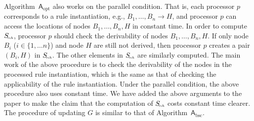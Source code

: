 \documentclass{article}
\begin{document}
Algorithm~$\mathsf{A}_{\text{opt}}$ also works on the parallel condition.
That is, each processor $p$ corresponds to a rule instantiation, e.g., $B_1,\ldots,B_n\rightarrow H$,
and processor $p$ can access the locations of nodes $B_1,\ldots,B_n, H$ in constant time.
In order to compute $S_{\!\textit{\tiny rch}}$, processor $p$ should check the derivability
of nodes $B_1,\ldots,B_n, H$. If only node $B_i$ ($i\in\{1,\ldots n\}$) and node $H$
are still not derived, then processor $p$ creates a pair $(B_i, H)$ in $S_{\!\textit{\tiny rch}}$.
The other elements in $S_{\!\textit{\tiny rch}}$ are similarly computed.
The main work of the above procedure is to check the derivability
of the nodes in the processed rule instantiation, which is the same as that of
checking the applicability of the rule instantiation.
Under the parallel condition, the above procedure also uses constant time.
We have added the above arguments to the paper to
make the claim that the computation of $S_{\!\textit{\tiny rch}}$ costs
constant time clearer.
The procedure of updating $G$ is similar to that of Algorithm~$\mathsf{A}_{\text{bsc}}$.



\end{document}
